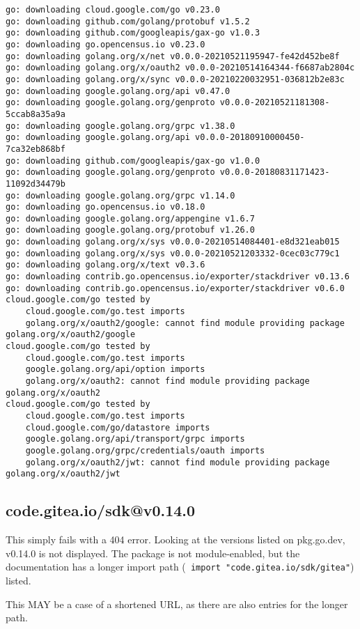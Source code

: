 \begin{verbatim}
go: downloading cloud.google.com/go v0.23.0
go: downloading github.com/golang/protobuf v1.5.2
go: downloading github.com/googleapis/gax-go v1.0.3
go: downloading go.opencensus.io v0.23.0
go: downloading golang.org/x/net v0.0.0-20210521195947-fe42d452be8f
go: downloading golang.org/x/oauth2 v0.0.0-20210514164344-f6687ab2804c
go: downloading golang.org/x/sync v0.0.0-20210220032951-036812b2e83c
go: downloading google.golang.org/api v0.47.0
go: downloading google.golang.org/genproto v0.0.0-20210521181308-5ccab8a35a9a
go: downloading google.golang.org/grpc v1.38.0
go: downloading google.golang.org/api v0.0.0-20180910000450-7ca32eb868bf
go: downloading github.com/googleapis/gax-go v1.0.0
go: downloading google.golang.org/genproto v0.0.0-20180831171423-11092d34479b
go: downloading google.golang.org/grpc v1.14.0
go: downloading go.opencensus.io v0.18.0
go: downloading google.golang.org/appengine v1.6.7
go: downloading google.golang.org/protobuf v1.26.0
go: downloading golang.org/x/sys v0.0.0-20210514084401-e8d321eab015
go: downloading golang.org/x/sys v0.0.0-20210521203332-0cec03c779c1
go: downloading golang.org/x/text v0.3.6
go: downloading contrib.go.opencensus.io/exporter/stackdriver v0.13.6
go: downloading contrib.go.opencensus.io/exporter/stackdriver v0.6.0
cloud.google.com/go tested by
	cloud.google.com/go.test imports
	golang.org/x/oauth2/google: cannot find module providing package golang.org/x/oauth2/google
cloud.google.com/go tested by
	cloud.google.com/go.test imports
	google.golang.org/api/option imports
	golang.org/x/oauth2: cannot find module providing package golang.org/x/oauth2
cloud.google.com/go tested by
	cloud.google.com/go.test imports
	cloud.google.com/go/datastore imports
	google.golang.org/api/transport/grpc imports
	google.golang.org/grpc/credentials/oauth imports
	golang.org/x/oauth2/jwt: cannot find module providing package golang.org/x/oauth2/jwt
\end{verbatim}


\subsection{code.gitea.io/sdk@v0.14.0}

This simply fails with a 404 error. Looking at the versions listed on
pkg.go.dev, v0.14.0 is not displayed. The package is not
module-enabled, but the documentation has a longer import path ({\tt
  import "code.gitea.io/sdk/gitea"}) listed.

This MAY be a case of a shortened URL, as there are also entries for
the longer path.

